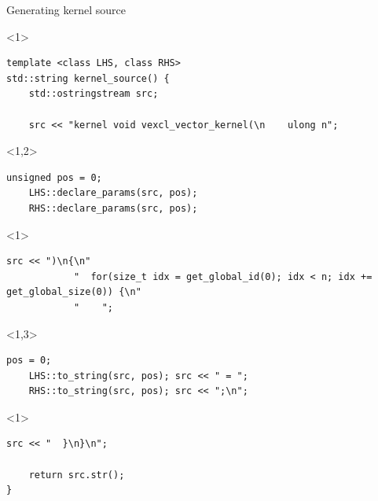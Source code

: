 \documentclass[@BEAMER_OPTIONS@]{beamer}
\begin{document}
\begin{frame}[fragile]{Generating kernel source}
    \begin{exampleblock}{}
        \begin{uncoverenv}<1>
            \begin{lstlisting}
template <class LHS, class RHS>
std::string kernel_source() {
    std::ostringstream src;

    src << "kernel void vexcl_vector_kernel(\n    ulong n";
            \end{lstlisting}
        \end{uncoverenv}
        \begin{uncoverenv}<1,2>
            \begin{lstlisting}[firstnumber=last]
    unsigned pos = 0;
    LHS::declare_params(src, pos);
    RHS::declare_params(src, pos);
            \end{lstlisting}
        \end{uncoverenv}
        \begin{uncoverenv}<1>
            \begin{lstlisting}[firstnumber=last]
    src << ")\n{\n"
            "  for(size_t idx = get_global_id(0); idx < n; idx += get_global_size(0)) {\n"
            "    ";
            \end{lstlisting}
        \end{uncoverenv}
        \begin{uncoverenv}<1,3>
            \begin{lstlisting}[firstnumber=last]
    pos = 0;
    LHS::to_string(src, pos); src << " = ";
    RHS::to_string(src, pos); src << ";\n";
            \end{lstlisting}
        \end{uncoverenv}
        \begin{uncoverenv}<1>
            \begin{lstlisting}[firstnumber=last]
    src << "  }\n}\n";

    return src.str();
}
            \end{lstlisting}
        \end{uncoverenv}
    \end{exampleblock}
\end{frame}

\note{ }
\end{document}
